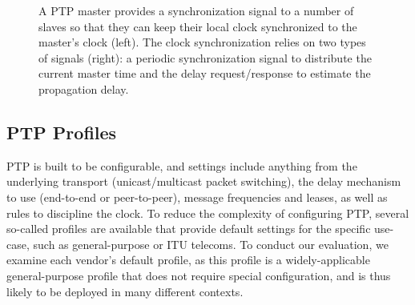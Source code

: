 \begin{figure}
    \caption{
        A PTP master provides a synchronization signal to a number of slaves so that they can keep their local clock synchronized to the master's clock (left). The clock synchronization relies on two types of signals (right): a periodic synchronization signal to distribute the current master time and the delay request/response to estimate the propagation delay.
    }
    \label{fig:ptp-architecture}
\end{figure}

\subsection{PTP Profiles}
PTP is built to be configurable, and settings include anything from the underlying transport (unicast/multicast packet switching), the delay mechanism to use (end-to-end or peer-to-peer), message frequencies and leases, as well as rules to discipline the clock. To reduce the complexity of configuring PTP, several so-called profiles are available that provide default settings for the specific use-case, such as general-purpose or ITU telecoms. To conduct our evaluation, we examine each vendor's default profile, as this profile is a widely-applicable general-purpose profile that does not require special configuration, and is thus likely to be deployed in many different contexts.


